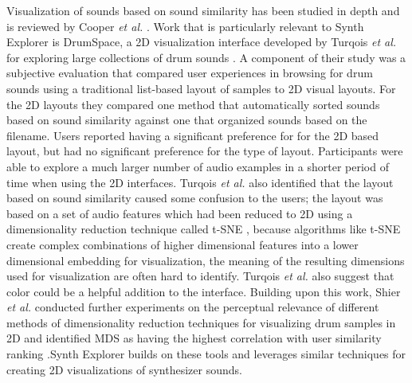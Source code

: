 Visualization of sounds based on sound similarity has been studied in depth and is reviewed by Cooper \textit{et al.} \cite{cooper2006visualization}. Work that is particularly relevant to Synth Explorer is DrumSpace, a 2D visualization interface developed by Turqois \textit{et al.} for exploring large collections of drum sounds \cite{turquois2016exploring}. A component of their study was a subjective evaluation that compared user experiences in browsing for drum sounds using a traditional list-based layout of samples to 2D visual layouts. For the 2D layouts they compared one method that automatically sorted sounds based on sound similarity against one that organized sounds based on the filename. Users reported having a significant preference for for the 2D based layout, but had no significant preference for the type of layout. Participants were able to explore a much larger number of audio examples in a shorter period of time when using the 2D interfaces. Turqois \textit{et al.} also identified that the layout based on sound similarity caused some confusion to the users; the layout was based on a set of audio features which had been reduced to 2D using a dimensionality reduction technique called t-SNE \cite{van2008visualizing}, because algorithms like t-SNE create complex combinations of higher dimensional features into a lower dimensional embedding for visualization, the meaning of the resulting dimensions used for visualization are often hard to identify. Turqois \textit{ et al.} also suggest that color could be a helpful addition to the interface. Building upon this work, Shier \textit{et al.} conducted further experiments on the perceptual relevance of different methods of dimensionality reduction techniques for visualizing drum samples in 2D and identified MDS as having the highest correlation with user similarity ranking \cite{shier2021manifold}.Synth Explorer builds on these tools and leverages similar techniques for creating 2D visualizations of synthesizer sounds.

